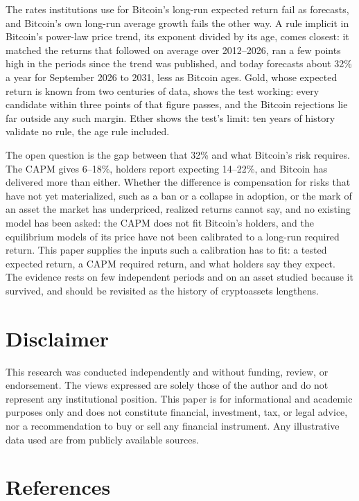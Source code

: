 \documentclass[12pt]{article}
\theoremstyle{plain}
\theoremstyle{remark}
\begin{document}
The rates institutions use for Bitcoin's long-run expected return fail as forecasts, and Bitcoin's own long-run average growth fails the other way. A rule implicit in Bitcoin's power-law price trend, its exponent divided by its age, comes closest: it matched the returns that followed on average over 2012--2026, ran a few points high in the periods since the trend was published, and today forecasts about 32\% a year for September 2026 to 2031, less as Bitcoin ages. Gold, whose expected return is known from two centuries of data, shows the test working: every candidate within three points of that figure passes, and the Bitcoin rejections lie far outside any such margin. Ether shows the test's limit: ten years of history validate no rule, the age rule included.

The open question is the gap between that 32\% and what Bitcoin's risk requires. The CAPM gives 6--18\%, holders report expecting 14--22\%, and Bitcoin has delivered more than either. Whether the difference is compensation for risks that have not yet materialized, such as a ban or a collapse in adoption, or the mark of an asset the market has underpriced, realized returns cannot say, and no existing model has been asked: the CAPM does not fit Bitcoin's holders, and the equilibrium models of its price have not been calibrated to a long-run required return. This paper supplies the inputs such a calibration has to fit: a tested expected return, a CAPM required return, and what holders say they expect. The evidence rests on few independent periods and on an asset studied because it survived, and should be revisited as the history of cryptoassets lengthens.

\section*{Disclaimer}

This research was conducted independently and without funding, review, or endorsement. The views expressed are solely those of the author and do not represent any institutional position. This paper is for informational and academic purposes only and does not constitute financial, investment, tax, or legal advice, nor a recommendation to buy or sell any financial instrument. Any illustrative data used are from publicly available sources.

\section*{References}
\begingroup
\small
\setlength{\parindent}{-1.5em}\setlength{\leftskip}{1.5em}\setlength{\parskip}{0.3em}\sloppy
\end{document}
